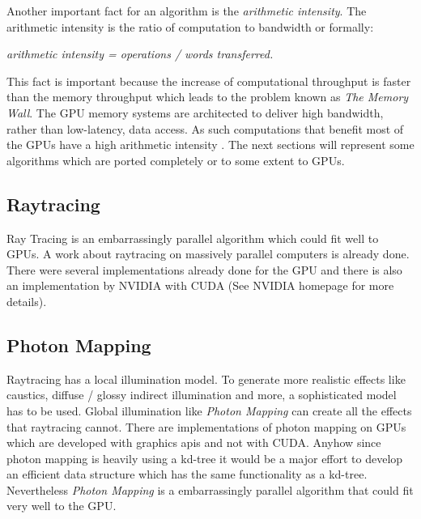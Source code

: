 Another important fact for an algorithm is the \emph{arithmetic intensity}. The
arithmetic intensity is the ratio of computation to bandwidth or formally:
\begin{center} 
 \emph{arithmetic intensity = operations / words transferred.}
\end{center}
This fact is important because the increase of computational throughput is
faster than the memory throughput which leads to the problem known as \emph{The
Memory Wall}. The \gls{GPU} memory systems are architected to deliver high bandwidth,
rather than low-latency, data access. As such computations that benefit most of
the \glspl{GPU} have a high arithmetic intensity \citep{citeulike:3733428}. The next 
sections will represent some algorithms which are ported completely or to some 
extent to \glspl{GPU}.

\subsection{Raytracing} %
\label{par:ray_tracing}
Ray Tracing \citep{citeulike:841961} is an embarrassingly parallel algorithm which
could fit well to \glspl{GPU}. A work about raytracing on
massively parallel computers \citep{citeulike:80546} is already done. 
There were several implementations already done for the \gls{GPU} and there is
also an implementation by \gls{NVIDIA} with \gls{CUDA} (See \gls{NVIDIA} homepage
for more details). 

\subsection{Photon Mapping} %
\label{par:photon_mapping}
Raytracing has a local illumination model. To generate more realistic effects
like caustics, diffuse / glossy indirect illumination and more, a 
sophisticated model has to be used. Global illumination like \emph{Photon
Mapping} \citep{citeulike:635695} can create all the effects that raytracing
cannot. There are implementations of photon mapping on \glspl{GPU}
\citep{Purcell:2003:PMO} which are developed with graphics apis and not with
\gls{CUDA}. Anyhow since photon mapping is heavily using a kd-tree it would be a major
effort to develop an efficient data structure which has the same functionality
as a kd-tree. Nevertheless \emph{Photon Mapping} is a embarrassingly parallel 
algorithm that could fit very well to the \gls{GPU}.

